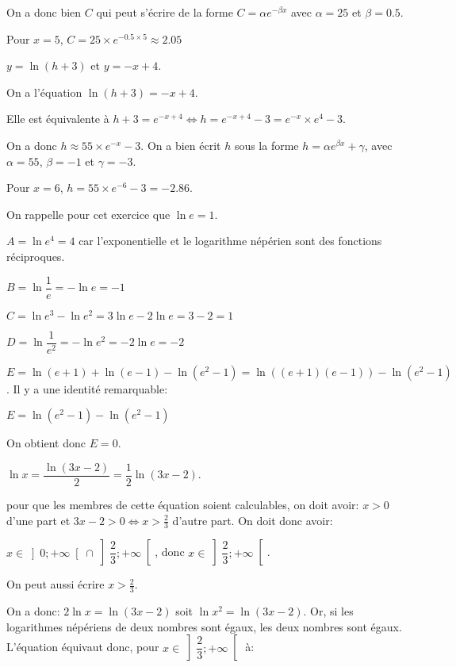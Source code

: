 \documentclass[a4paper,12pt]{scrartcl}
\begin{document}
On a donc bien $C$ qui peut s'écrire de la forme $C = \alpha e^{-\beta x}$ avec $\alpha = 25$ et $\beta = 0.5$.

\question{}
Pour $x = 5$, $C = 25 \times e^{-0.5 \times 5} \approx 2.05$

\exo{}
$y = \ln(h+3) $ et $y = -x +4$.

\question{}
On a l'équation $\ln(h+3) = -x +4$. 

Elle est équivalente à $h+3 = e^{-x +4} \Leftrightarrow h = e^{-x +4} - 3 = e^{-x} \times e^4 - 3$. 

On a donc $h \approx 55 \times e^{-x} - 3$. On a bien écrit $h$ sous la forme $h = \alpha e^{\beta x} + \gamma$, avec $\alpha = 55$, $\beta = -1$ et $\gamma = -3$.

\question{}
Pour $x = 6$, $h = 55 \times e^{-6} - 3 = -2.86$.

On rappelle pour cet exercice que $\ln e = 1$.

\question{}
$A = \ln e^4 = 4$ car l'exponentielle et le logarithme népérien sont des fonctions réciproques.

\question{}
$B = \ln \dfrac{1}{e} = -\ln e = -1$ 

\question{}
$C = \ln e^3 - \ln e^2 = 3 \ln e - 2 \ln e = 3-2 = 1$ 

\question{}
$D = \ln \dfrac{1}{e^2} = -\ln e^2 = -2 \ln e = -2$

\question{}
$E = \ln(e + 1) + \ln(e - 1) - \ln(e^2- 1) = \ln \left( (e + 1)(e - 1) \right) - \ln(e^2- 1)$. Il y a une identité remarquable:

$E = \ln(e^2- 1) - \ln(e^2- 1)$

On obtient donc $E = 0$.

$\ln x = \dfrac{\ln(3x-2)}{2} = \dfrac{1}{2} \ln(3x-2)$.

pour que les membres de cette équation soient calculables, on doit avoir: $x > 0$ d'une part et $3x - 2 > 0 \Leftrightarrow x > \frac{2}{3}$ d'autre part. On doit donc avoir:

$x \in \left] 0 ; +\infty \right[ \cap \left] \dfrac{2}{3} ; +\infty \right[$, donc $x \in \left] \dfrac{2}{3} ; +\infty \right[$. 

On peut aussi écrire $x > \frac{2}{3}$.

On a donc: $2\ln x = \ln(3x-2)$ soit $\ln x^2 = \ln(3x-2)$. Or, si les logarithmes népériens de deux nombres sont égaux, les deux nombres sont égaux. L'équation équivaut donc, pour $x \in \left] \dfrac{2}{3} ; +\infty \right[$ à:
\end{document}

